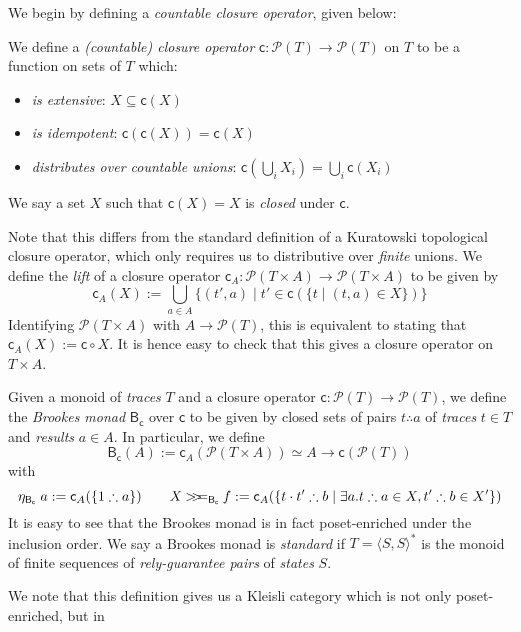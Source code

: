 \documentclass[acmsmall,screen,review]{acmart}
\newcommand{\mc}[1]{\ensuremath{\mathcal{#1}}}
\newcommand{\ms}[1]{\ensuremath{\mathsf{#1}}}
\newcommand{\obind}{\mathbin{>\!\!>\mkern-6.7mu=}}
\newcommand{\mbind}[3]{#2 \obind_{#1} #3}
\newcommand{\tret}[2]{#1 \therefore #2}
\begin{document}
We begin by defining a \emph{countable closure operator}, given below:
\begin{definition}
  We define a \emph{(countable) closure operator} $\ms{c}: \mc{P}(T) \to \mc{P}(T)$ on $T$ to be a
  function on sets of $T$ which:
  \begin{itemize}
    \item \emph{is extensive}: $X \subseteq \ms{c}(X)$
    \item \emph{is idempotent}: $\ms{c}(\ms{c}(X)) = \ms{c}(X)$
    \item \emph{distributes over countable unions}: $\ms{c}(\bigcup_i X_i) = \bigcup_i \ms{c}(X_i)$
  \end{itemize}
  We say a set $X$ such that $\ms{c}(X) = X$ is \emph{closed} under $\ms{c}$. 
\end{definition}
Note that this differs from the standard definition of a Kuratowski topological closure operator,
which only requires us to distributive over \emph{finite} unions. We define the \emph{lift} of a
closure operator $\ms{c}_A : \mc{P}(T \times A) \to \mc{P}(T \times A)$ to be given by
\begin{equation*}
  \ms{c}_A(X) := \bigcup_{a \in A}\{(t', a) \mid t' \in \ms{c}(\{t \mid (t, a) \in X\})\}
\end{equation*}
Identifying $\mc{P}(T \times A)$ with $A \to \mc{P}(T)$, this is equivalent to stating that
$\ms{c}_A(X) := \ms{c} \circ X$. It is hence easy to check that this gives a closure operator on $T
\times A$.
\begin{definition}
  Given a monoid of \emph{traces} $T$ and a closure operator $\ms{c}: \mc{P}(T) \to \mc{P}(T)$, we
  define the \emph{Brookes monad} $\ms{B}_{\ms{c}}$ over $\ms{c}$ to be given by closed sets of
  pairs $\tret{t}{a}$ of \emph{traces} $t \in T$ and \emph{results} $a \in A$. In particular, we
  define
  $$
  \ms{B}_{\ms{c}}(A) := \ms{c}_A(\mc{P}(T \times A)) \simeq A \to \ms{c}(\mc{P}(T))
  $$
  with
  $$
  \eta_{\ms{B}_{\ms{c}}}\;a := \ms{c}_A(\{\tret{1}{a}\}) \qquad
  \mbind{\ms{B}_{\ms{c}}}{X}{f} 
  := \ms{c}_A(\{\tret{t \cdot t'}{b} \mid \exists a . \tret{t}{a} \in X, \tret{t'}{b} \in X'\})
  $$
  It is easy to see that the Brookes monad is in fact poset-enriched under the inclusion order. We
  say a Brookes monad is \emph{standard} if $T = \langle S, S \rangle^*$ is the monoid of finite
  sequences of \emph{rely-guarantee pairs} of \emph{states} $S$.
\end{definition}
We note that this definition gives us a Kleisli category which is not only poset-enriched, but in
\end{document}
